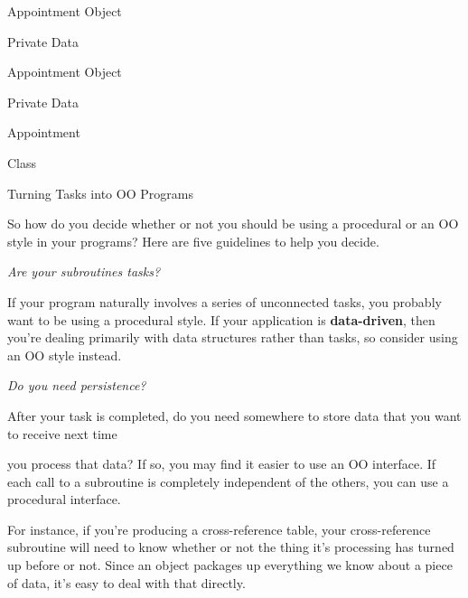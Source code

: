 \documentclass[a4paper,11pt]{book}
\begin{document}
\noindent 

\noindent 

\noindent 

\noindent 

\noindent 

\noindent 

\noindent 

\noindent Appointment Object

\noindent 

\noindent Private Data

\noindent Appointment Object

\noindent 

\noindent Private Data

\noindent 

\noindent Appointment

\noindent Class

\noindent 

\noindent 

\noindent 

\noindent 

\noindent 

\noindent Turning Tasks into OO Programs

\noindent 

\noindent So how do you decide whether or not you should be using a procedural or an OO style in your programs? Here are five guidelines to help you decide.

\noindent 

\noindent \textit{Are your subroutines tasks?}

\noindent If your program naturally involves a series of unconnected tasks, you probably want to be using a procedural style. If your application is \textbf{data-driven}, then you're dealing primarily with data structures rather than tasks, so consider using an OO style instead.

\noindent 

\noindent \textit{Do you need persistence?}

\noindent After your task is completed, do you need somewhere to store data that you want to receive next time

\noindent you process that data? If so, you may find it easier to use an OO interface. If each call to a subroutine is completely independent of the others, you can use a procedural interface.

\noindent 

\noindent For instance, if you're producing a cross-reference table, your cross-reference subroutine will need to know whether or not the thing it's processing has turned up before or not. Since an object packages up everything we know about a piece of data, it's easy to deal with that directly.
\end{document}
